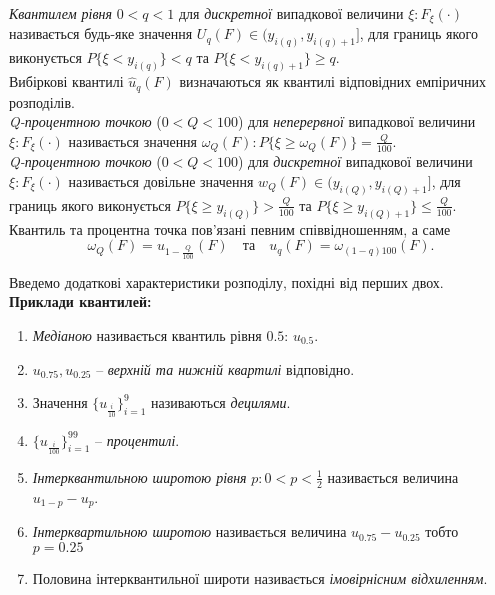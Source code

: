 \textit{Квантилем рівня} $0 < q < 1$ для \textit{дискретної} випадкової величини $\xi: F_\xi(\cdot)$ називається будь-яке значення $U_q(F)\in (y_{i(q)}, y_{i(q)+1}]$, для границь якого виконується $P\{ \xi < y_{i(q)}\} < q$ та $P\{ \xi < y_{i(q) + 1}\} \ge q$. \\

Вибіркові квантилі $\widehat{u}_q(F)$ визначаються як квантилі відповідних емпіричних розподілів. \\

\textit{Q-процентною точкою} ($0 < Q <100$) для \textit{неперервної} випадкової величини $\xi: F_\xi(\cdot)$ називається значення $\omega_Q(F): P\{ \xi \ge \omega_Q(F) \} = \frac{Q}{100}$. \\

\textit{Q-процентною точкою} ($0 < Q <100$) для \textit{дискретної} випадкової величини $\xi: F_\xi(\cdot)$ називається довільне значення $w_Q(F) \in (y_{i(Q)}, y_{i(Q)+1}]$, для границь якого виконується $P\{ \xi \ge y_{i(Q)}\} > \frac{Q}{100}$ та $P\{ \xi \ge y_{i(Q)+1}\} \le \frac{Q}{100}$. \\

Квантиль та процентна точка пов'язані певним співвідношенням, а саме \[\omega_Q(F)=u_{1-\frac{Q}{100}}(F)\quad\text{та} \quad u_q(F) = \omega_{(1-q)100}(F). \]

Введемо додаткові характеристики розподілу, похідні від перших двох. \\

\textbf{Приклади квантилей:}

\begin{enumerate}
	\item \textit{Медіаною} називається квантиль рівня $0.5$: $u_{0.5}$.
	\item $u_{0.75}, u_{0.25}$ -- \textit{верхній та нижній квартилі} відповідно.
	\item Значення $\{ u_{\frac{i}{10}}\}_{i=1}^9$ називаються \textit{децилями}.
	\item $\{ u_{\frac{i}{100}}\}_{i=1}^{99}$ -- \textit{процентилі}.
	\item \textit{Інтерквантильною широтою рівня} $p: 0 < p < \frac{1}{2}$ називається величина $u_{1-p}-u_p$.
	\item \textit{Інтерквартильною широтою} називається величина $u_{0.75} - u_{0.25}$ тобто $p = 0.25$ 
	\item Половина інтерквантильної широти називається \textit{імовірнісним відхиленням}.
\end{enumerate}

